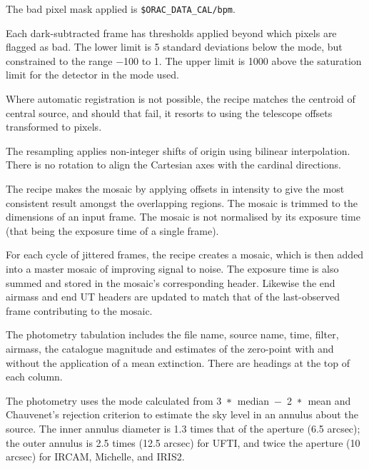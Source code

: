 \documentclass[twoside,11pt,nolof]{starlink}
\providecommand{\lsk}{\raisebox{-0.4ex}{\rm *}}
\begin{document}
{{{         \sstitem
         The bad pixel mask applied is {\tt\$ORAC\_DATA\_CAL/bpm}.

         \sstitem
         Each dark-subtracted frame has thresholds applied beyond which
         pixels are flagged as bad.  The lower limit is 5 standard
         deviations below the mode, but constrained to the range $-$100 to 1.
         The upper limit is 1000 above the saturation limit for the detector
         in the mode used.

         \sstitem
         Where automatic registration is not possible, the recipe matches
         the centroid of central source, and should that fail, it resorts
         to using the telescope offsets transformed to pixels.

         \sstitem
         The resampling applies non-integer shifts of origin using
         bilinear interpolation.  There is no rotation to align the
         Cartesian axes with the cardinal directions.

         \sstitem
         The recipe makes the mosaic by applying offsets in intensity to
         give the most consistent result amongst the overlapping regions.
         The mosaic is trimmed to the dimensions of an input frame.  The
         mosaic is not normalised by its exposure time (that being the
         exposure time of a single frame).

         \sstitem
         For each cycle of jittered frames, the recipe creates a mosaic,
         which is then added into a master mosaic of improving signal to
         noise.  The exposure time is also summed and stored in the mosaic's
         corresponding header.  Likewise the end airmass and end UT headers
         are updated to match that of the last-observed frame contributing
         to the mosaic.

         \sstitem
         The photometry tabulation includes the file name, source name,
         time, filter, airmass, the catalogue magnitude and estimates of
         the zero-point with and without the application of a mean
         extinction.  There are headings at the top of each column.

         \sstitem

         The photometry uses the mode calculated from
         \mbox{3 $\lsk$ median $-$ 2 $\lsk$ mean} and Chauvenet's
         rejection criterion to estimate the sky level in an annulus
         about the source. The inner annulus diameter is 1.3 times
         that of the aperture (6.5 arcsec); the outer annulus is 2.5
         times (12.5 arcsec) for UFTI, and twice the aperture (10 arcsec)
         for IRCAM, Michelle, and IRIS2.

}}}
\end{document}

